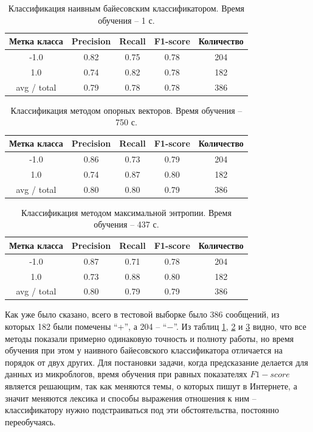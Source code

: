 \begin{table}[h]
    \centering
    \begin{tabular}{|c|c|c|c|c|}
      \hline
      \textbf{Метка класса} & \textbf{Precision} & \textbf{Recall} & \textbf{F1-score} &
      \textbf{Количество} \\ \hline
      -1.0&0.82&0.75&0.78&204\\ \hline
      1.0&0.74&0.82&0.78&182\\ \hline \hline
      avg / total&0.79&0.78&0.78&386\\
      \hline
    \end{tabular}
    \caption{Классификация наивным байесовским классификатором. Время обучения -- 1 с.}\label{tab:nb}
\end{table}
\begin{table}[h!]
    \centering
    \begin{tabular}{|c|c|c|c|c|}
      \hline
      \textbf{Метка класса} & \textbf{Precision} & \textbf{Recall} & \textbf{F1-score} &
      \textbf{Количество} \\ \hline
      -1.0&0.86&0.73&0.79&204\\ \hline
      1.0&0.74&0.87&0.80&182\\ \hline \hline
      avg / total&0.80&0.80&0.79&386\\
      \hline
    \end{tabular}
    \caption{Классификация методом опорных векторов. Время обучения -- 750 с.}\label{tab:svm}
\end{table}
\begin{table}[h!]
  \centering
    \begin{tabular}{|c|c|c|c|c|}
      \hline
      \textbf{Метка класса} & \textbf{Precision} & \textbf{Recall} & \textbf{F1-score} & \textbf{Количество} \\ \hline
      -1.0&0.87&0.71&0.78&204\\ \hline
      1.0&0.73&0.88&0.80&182\\ \hline \hline
      avg / total&0.80&0.79&0.79&386\\
      \hline
    \end{tabular}
    \caption{Классификация методом максимальной энтропии. Время обучения -- 437 с.}\label{tab:maxent}
\end{table}

Как уже было сказано, всего в тестовой выборке было 386 сообщений, из которых 182 были помечены
``+'', а 204 -- ``$\minus$''. Из таблиц \ref{tab:nb}, \ref{tab:svm} и \ref{tab:maxent} видно, что все методы показали
примерно одинаковую точность и полноту работы, но время обучения при этом у наивного байесовского
классификатора отличается на порядок от двух других.  Для постановки задачи, когда предсказание делается для данных из
микроблогов, время обучения при равных показателях $F1-score$ является решающим, так как меняются
темы, о которых пишут в Интернете, а значит меняются лексика и способы выражения отношения к ним --
классификатору нужно подстраиваться под эти обстоятельства, постоянно переобучаясь.

